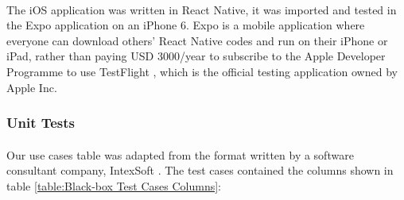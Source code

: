 \documentclass[12pt,a4paper]{article}
\begin{document}
          \paragraph{} The iOS application was written in React Native, it was imported and tested in the Expo \cite{Expo} application on an iPhone 6. Expo is a mobile application where everyone can download others' React Native codes and run on their iPhone or iPad, rather than paying USD 3000/year to subscribe to the Apple Developer Programme to use TestFlight \cite{TestFlight}, which is the official testing application owned by Apple Inc. 
        
        \subsubsection{Unit Tests} %
          \paragraph{}Our use cases table was adapted from the format written by a software consultant company, IntexSoft \cite{UseCaseTestingReference}. The test cases contained the columns shown in table \ref{table:Black-box Test Cases Columns}: 
\end{document}
